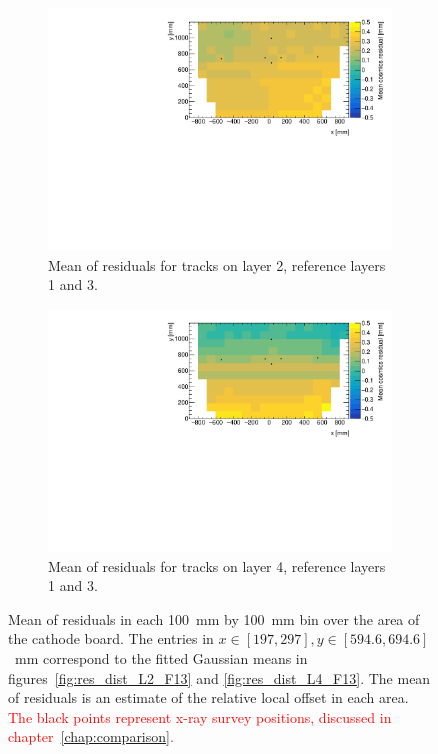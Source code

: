 \begin{figure}
\centering
\begin{subfigure}{0.85\textwidth}
  \centering
  \includegraphics[width=\linewidth]{figures/figure_QL2P11_3100V_2021-08-05_fit_means_xray_overlay_layer2_fixedlayers13.pdf}
  \caption{Mean of residuals for tracks on layer 2, reference layers 1 and 3.}
  \label{fig:res_mean_th2_L2_F13}
\end{subfigure}%
\vspace*{\floatsep}
\begin{subfigure}{0.85\textwidth}
  \centering
  \includegraphics[width=\linewidth]{figures/figure_QL2P11_3100V_2021-08-05_fit_means_xray_overlay_layer4_fixedlayers13.pdf}
  \caption{Mean of residuals for tracks on layer 4, reference layers 1 and 3.}
  \label{fig:res_mean_th2_L4_F13}
\end{subfigure}
\caption{Mean of residuals in each \SI{100}{\milli\meter} by \SI{100}{\milli\meter} bin over the area of the cathode board. The entries in $x\in\left[197, 297\right],  y\in\left[594.6, 694.6\right]$~mm correspond to the fitted Gaussian means in figures~\ref{fig:res_dist_L2_F13} and \ref{fig:res_dist_L4_F13}. The mean of residuals is an estimate of the relative local offset in each area. \textcolor{red}{The black points represent x-ray survey positions, discussed in chapter~\ref{chap:comparison}.}}
\label{fig:res_mean_th2}
\end{figure}

